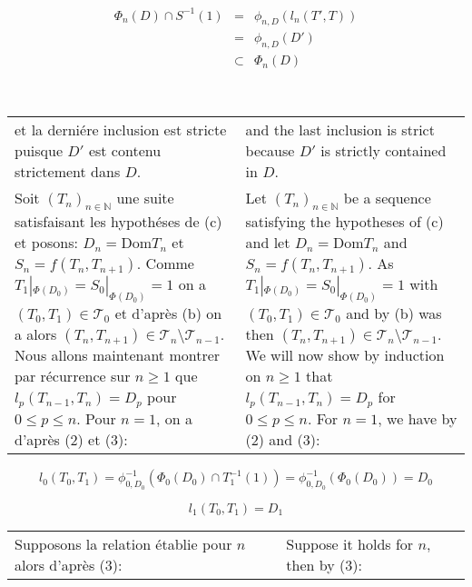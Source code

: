 \documentclass[12pt]{article}
\theoremstyle{plain}
\theoremstyle{definition}
\theoremstyle{remark}
\begin{document}
\[
\begin{array}{rcl}
\Phi_n(D) \cap S^{-1}(1)
& = &
\phi_{n,D}(l_n(T',T))
\\ & = &
\phi_{n,D}(D')
\\ & \subset &
\Phi_n(D)
\end{array}
\]

\

\begin{tabular}{p{2.8in} p{2.8in}}

et la derni\'ere inclusion est stricte puisque $D'$ est contenu strictement dans $D$.

&

and the last inclusion is strict because $D'$ is strictly contained in $D$.

\\

Soit $(T_n)_{n\in \mathbb{N}}$ une suite satisfaisant les hypoth\'eses de (c) et posons: $D_n = \mathrm{Dom}T_n$ et $S_n = f(T_n,T_{n+1})$. Comme $T_1|_{\Phi(D_0)} = S_0|_{\Phi(D_0)} = 1$ on a $(T_0,T_1) \in \mathcal{T}_0$ et d'apr\`es (b) on a alors $(T_n,T_{n+1}) \in \mathcal{T}_n\setminus\mathcal{T}_{n-1}$. Nous allons maintenant montrer par r\'ecurrence sur $n\geq 1$ que $l_p(T_{n-1},T_n) = D_p$ pour $0 \leq p \leq n$. Pour $n=1$, on a d'apr\`es (2) et (3):

&

Let $(T_n)_{n\in \mathbb{N}}$ be a sequence satisfying the hypotheses of (c) and let $D_n = \mathrm{Dom}T_n$ and $S_n = f(T_n,T_{n+1})$. As $T_1|_{\Phi(D_0)} = S_0|_{\Phi(D_0)} = 1$ with $(T_0,T_1) \in \mathcal{T}_0$ and by (b) was then $(T_n,T_{n+1}) \in \mathcal{T}_n\setminus\mathcal{T}_{n-1}$. We will now show by induction on $n \geq 1$ that $l_p(T_{n-1},T_n) = D_p$ for $0 \leq p \leq n$. For $n=1$, we have by (2) and (3):

\end{tabular}

\[
l_0(T_0,T_1) = \phi_{0,D_0}^{-1}(\Phi_0(D_0) \cap T_1^{-1}(1)) = \phi_{0,D_0}^{-1}(\Phi_0(D_0)) = D_0
\]

\[
l_1(T_0,T_1) = D_1
\]

\begin{tabular}{p{2.8in} p{2.8in}}

Supposons la relation \'etablie pour $n$ alors d'apr\`es (3):

&

Suppose it holds for $n$, then by (3):

\end{tabular}
\end{document}
